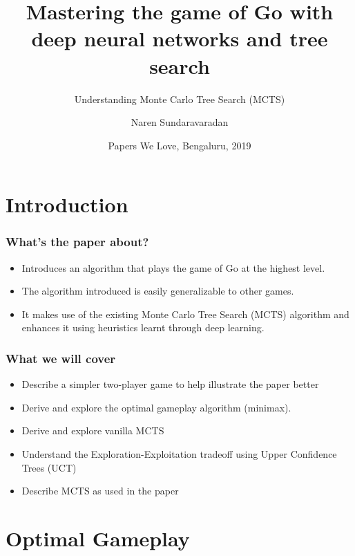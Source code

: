 \documentclass{beamer}
\title[Crisis]{Mastering the game of Go with deep neural networks and tree search}
\subtitle{Understanding Monte Carlo Tree Search (MCTS)}
\author{Naren Sundaravaradan}
\institute{Unifie}
\date{Papers We Love, Bengaluru, 2019}
\begin{document}
\frame{\titlepage}

\section{Introduction}

\begin{frame}
  \frametitle{What's the paper about?}
  \begin{itemize}
  \item Introduces an algorithm that plays the game of Go at the highest level.
    \pause
  \item The algorithm introduced is easily generalizable to other games.
    \pause
  \item It makes use of the existing Monte Carlo Tree Search (MCTS) algorithm and enhances it using heuristics learnt through deep learning.
  \end{itemize}
\end{frame}

\begin{frame}
  \frametitle{What we will cover}
  \begin{itemize}
  \item Describe a simpler two-player game to help illustrate the paper better
    \pause
  \item Derive and explore the optimal gameplay algorithm (minimax).
    \pause
  \item Derive and explore vanilla MCTS
    \pause
  \item Understand the Exploration-Exploitation tradeoff using Upper Confidence Trees (UCT)
    \pause
  \item Describe MCTS as used in the paper
  \end{itemize}
\end{frame}

\section{Optimal Gameplay}
\end{document}
